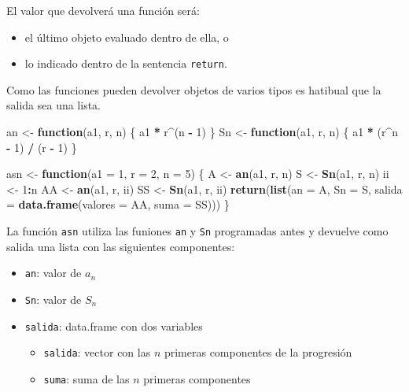 \documentclass[]{book}
\newenvironment{Shaded}{\begin{snugshade}}{\end{snugshade}}
\newcommand{\KeywordTok}[1]{\textcolor[rgb]{0.13,0.29,0.53}{\textbf{#1}}}
\newcommand{\DataTypeTok}[1]{\textcolor[rgb]{0.13,0.29,0.53}{#1}}
\newcommand{\DecValTok}[1]{\textcolor[rgb]{0.00,0.00,0.81}{#1}}
\newcommand{\StringTok}[1]{\textcolor[rgb]{0.31,0.60,0.02}{#1}}
\newcommand{\ControlFlowTok}[1]{\textcolor[rgb]{0.13,0.29,0.53}{\textbf{#1}}}
\newcommand{\OperatorTok}[1]{\textcolor[rgb]{0.81,0.36,0.00}{\textbf{#1}}}
\newcommand{\NormalTok}[1]{#1}
\providecommand{\tightlist}{%
  \setlength{\itemsep}{0pt}\setlength{\parskip}{0pt}}
\begin{document}
El valor que devolverá una función será:

\begin{itemize}
\item
  el último objeto evaluado dentro de ella, o
\item
  lo indicado dentro de la sentencia \texttt{return}.
\end{itemize}

Como las funciones pueden devolver objetos de varios tipos es hatibual
que la salida sea una lista.

\begin{Shaded}
\begin{Highlighting}[]
\NormalTok{an <-}\StringTok{ }\ControlFlowTok{function}\NormalTok{(a1, r, n) \{ a1 }\OperatorTok{*}\StringTok{ }\NormalTok{r}\OperatorTok{^}\NormalTok{(n }\OperatorTok{-}\StringTok{ }\DecValTok{1}\NormalTok{) \}}
\NormalTok{Sn <-}\StringTok{ }\ControlFlowTok{function}\NormalTok{(a1, r, n) \{ a1 }\OperatorTok{*}\StringTok{ }\NormalTok{(r}\OperatorTok{^}\NormalTok{n }\OperatorTok{-}\StringTok{ }\DecValTok{1}\NormalTok{) }\OperatorTok{/}\StringTok{ }\NormalTok{(r }\OperatorTok{-}\StringTok{ }\DecValTok{1}\NormalTok{) \}}
  
\NormalTok{asn <-}\StringTok{ }\ControlFlowTok{function}\NormalTok{(}\DataTypeTok{a1 =} \DecValTok{1}\NormalTok{, }\DataTypeTok{r =} \DecValTok{2}\NormalTok{, }\DataTypeTok{n =} \DecValTok{5}\NormalTok{) \{}
\NormalTok{  A <-}\StringTok{ }\KeywordTok{an}\NormalTok{(a1, r, n)}
\NormalTok{  S <-}\StringTok{ }\KeywordTok{Sn}\NormalTok{(a1, r, n)}
\NormalTok{  ii <-}\StringTok{ }\DecValTok{1}\OperatorTok{:}\NormalTok{n}
\NormalTok{  AA <-}\StringTok{ }\KeywordTok{an}\NormalTok{(a1, r, ii)}
\NormalTok{  SS <-}\StringTok{ }\KeywordTok{Sn}\NormalTok{(a1, r, ii)}
  \KeywordTok{return}\NormalTok{(}\KeywordTok{list}\NormalTok{(}\DataTypeTok{an =}\NormalTok{ A, }\DataTypeTok{Sn =}\NormalTok{ S, }\DataTypeTok{salida =} \KeywordTok{data.frame}\NormalTok{(}\DataTypeTok{valores =}\NormalTok{ AA, }\DataTypeTok{suma =}\NormalTok{ SS)))}
\NormalTok{\}}
\end{Highlighting}
\end{Shaded}

La función \texttt{asn} utiliza las funiones \texttt{an} y \texttt{Sn}
programadas antes y devuelve como salida una lista con las siguientes
componentes:

\begin{itemize}
\tightlist
\item
  \texttt{an}: valor de \(a_n\)
\item
  \texttt{Sn}: valor de \(S_n\)
\item
  \texttt{salida}: data.frame con dos variables

  \begin{itemize}
  \tightlist
  \item
    \texttt{salida}: vector con las \(n\) primeras componentes de la
    progresión
  \item
    \texttt{suma}: suma de las \(n\) primeras componentes
  \end{itemize}
\end{itemize}
\end{document}

